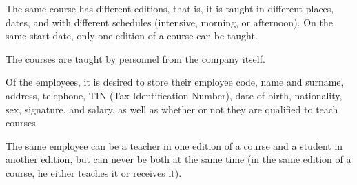 \documentclass{article}
\begin{document}
The same course has different editions, that is, it is taught in different places, dates, and with different schedules (intensive, morning, or afternoon).  On the same start date, only one edition of a course can be taught.

The courses are taught by personnel from the company itself.

Of the employees, it is desired to store their employee code, name and surname, address, telephone, TIN (Tax Identification Number), date of birth, nationality, sex, signature, and salary, as well as whether or not they are qualified to teach courses.

The same employee can be a teacher in one edition of a course and a student in another edition, but can never be both at the same time (in the same edition of a course, he either teaches it or receives it).
\end{document}
